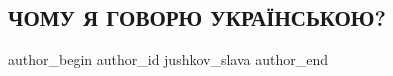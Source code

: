 
 
 
 
 
 
\subsection{ЧОМУ Я ГОВОРЮ УКРАЇНСЬКОЮ?}
\label{sec:14_07_2021.fb.jushkov_slava.1.mova_pochemu}
 
\ifcmt
 author_begin
   author_id jushkov_slava
 author_end
\fi
